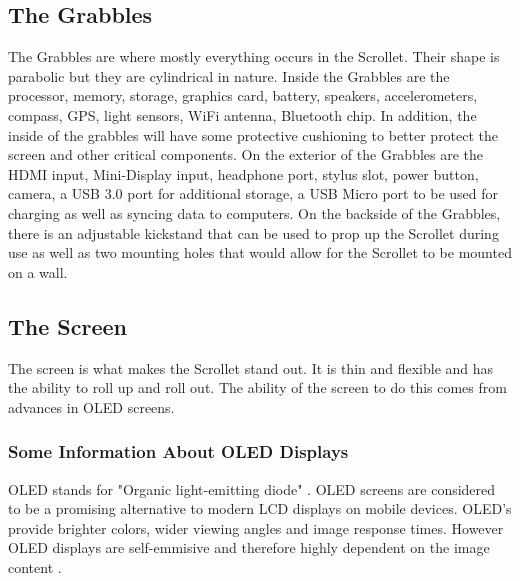 \documentclass[a4paper]{article}
\begin{document}
\subsection{The Grabbles}
The Grabbles are where mostly everything occurs in the Scrollet. Their shape is parabolic but they are cylindrical in nature. Inside the Grabbles are the processor, memory, storage, graphics card, battery, speakers, accelerometers, compass, GPS, light sensors, WiFi antenna, Bluetooth chip. In addition, the inside of the grabbles will have some protective cushioning to better protect the screen and other critical components. On the exterior of the Grabbles are the HDMI input, Mini-Display input, headphone port, stylus slot, power button, camera, a USB 3.0 port for additional storage, a USB Micro port to be used for charging as well as syncing data to computers. On the backside of the Grabbles, there is an adjustable kickstand that can be used to prop up the Scrollet during use as well as two mounting holes that would allow for the Scrollet to be mounted on a wall.

\subsection{The Screen}
The screen is what makes the Scrollet stand out. It is thin and flexible and has the ability to roll up and roll out. The ability of the screen to do this comes from advances in OLED screens. 

\subsubsection{Some Information About OLED Displays}
OLED stands for "Organic light-emitting diode" \cite{Lin}. OLED screens are considered to be a promising alternative to modern LCD displays on mobile devices.\cite{Lin} OLED's provide brighter colors, wider viewing angles and image response times. However OLED displays are self-emmisive and therefore highly dependent on the image content \cite{Lin}.
\end{document}
